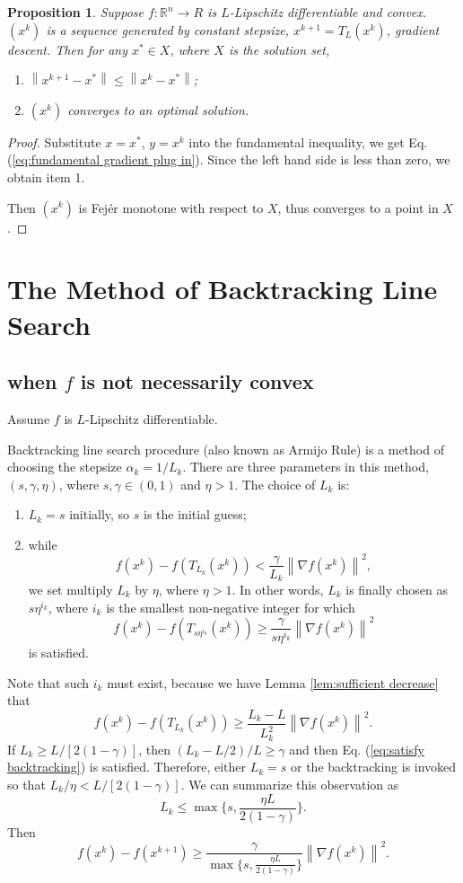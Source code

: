 \documentclass[12pt,a4paper]{report}
\numberwithin{equation}{section}
\theoremstyle{mystyle}
\newtheorem{proposition}[definition]{Proposition}
\newcommand{\R}{\mathbb{R}}
\newcommand{\grad}{\nabla}
\newcommand{\norm}[1]{\left\lVert #1 \right\rVert}
\begin{document}
	\begin{proposition}
		Suppose $f:\R^n\to R$ is $L$-Lipschitz differentiable and convex. $(x^k)$ is a sequence generated by constant stepsize, $x^{k+1}=T_L(x^k)$, gradient descent. Then for any $x^*\in X$, where $X$ is the solution set, 
		\begin{enumerate}
			\item $\norm{x^{k+1}-x^*}\leq \norm{x^k-x^*}$;
			\item $(x^k)$ converges to an optimal solution. 
		\end{enumerate}
	\end{proposition}
	\begin{proof}
		Substitute $x=x^*$, $y=x^k$ into the fundamental inequality, we get Eq. (\ref{eq:fundamental gradient plug in}). Since the left hand side is less than zero, we obtain item 1.
		
		Then $(x^k)$ is Fej\'{e}r monotone with respect to $X$, thus converges to a point in $X$.
	\end{proof}
	
	
	\section{The Method of Backtracking Line Search}
	
	\subsection{when $f$ is not necessarily convex}
	Assume $f$ is $L$-Lipschitz differentiable.
	
	Backtracking line search procedure (also known as Armijo Rule) is a method of choosing the stepsize $\alpha_k=1/L_k$. There are three parameters in this method, $(s,\gamma,\eta)$, where $s,\gamma\in (0,1)$ and $\eta>1$. The choice of $L_k$ is:
	\begin{enumerate}
		\item $L_k=s$ initially, so $s$ is the initial guess;
		\item while
		$$
		f(x^k)-f(T_{L_k}(x^k))<\frac{\gamma}{L_k}\norm{\grad f(x^k)}^2,
		$$
		we set multiply $L_k$ by $\eta$, where $\eta>1$. In other words, $L_k$ is finally chosen as $s\eta^{i_k}$, where $i_k$ is the smallest non-negative integer for which
		\begin{equation}\label{eq:satisfy backtracking}
			f(x^k)-f(T_{s\eta^{i_k}}(x^k))\geq \frac{\gamma}{s\eta^{i_k}}\norm{\grad f(x^k)}^2
		\end{equation}
		is satisfied.
	\end{enumerate}
	Note that such $i_k$ must exist, because we have Lemma \ref{lem:sufficient decrease} that
	$$
	f(x^k)-f(T_{L_k}(x^k))\geq \frac{L_k-L}{L_k^2}\norm{\grad f(x^k)}^2.
	$$
	If $L_k\geq L/[2(1-\gamma)]$, then $(L_k-L/2)/L\geq \gamma$ and then Eq. (\ref{eq:satisfy backtracking}) is satisfied. Therefore, either $L_k=s$ or the backtracking is invoked so that $L_k/\eta<L/[2(1-\gamma)]$. We can summarize this observation as
	$$
	L_k\leq \max\{s,\frac{\eta L}{2(1-\gamma)}\}.
	$$
	Then
	$$
	f(x^k)-f(x^{k+1})\geq \frac{\gamma}{\max\{s,\frac{\eta L}{2(1-\gamma)}\}}\norm{\grad f(x^k)}^2.
	$$
	
\end{document}
